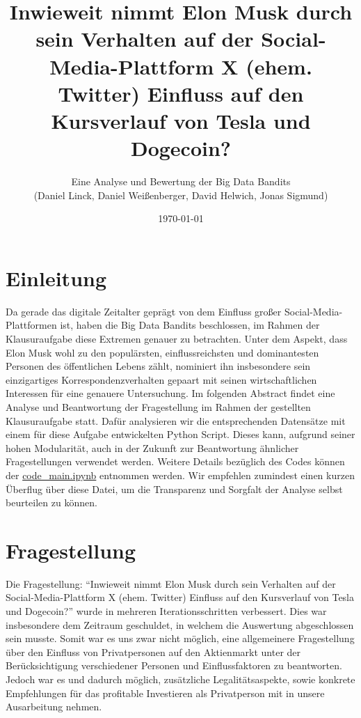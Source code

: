 \documentclass{article}
\title{\textbf {Inwieweit nimmt Elon Musk durch sein Verhalten auf der Social-Media-Plattform X (ehem. Twitter) Einfluss auf den Kursverlauf von Tesla und Dogecoin?}}
\author{Eine Analyse und Bewertung der Big Data Bandits \\ (Daniel Linck, Daniel Weißenberger, David Helwich, Jonas Sigmund)}
\date{\today}
\begin{document}
\maketitle

\tableofcontents
\newpage

\section{Einleitung} \label{Einleitung}
Da gerade das digitale Zeitalter geprägt von dem Einfluss großer Social-Media-Plattformen ist, haben die Big Data Bandits beschlossen, im Rahmen der Klausuraufgabe diese Extremen genauer zu betrachten.
Unter dem Aspekt, dass Elon Musk wohl zu den populärsten, einflussreichsten und dominantesten Personen des öffentlichen Lebens zählt, nominiert ihn insbesondere sein einzigartiges Korrespondenzverhalten gepaart mit seinen wirtschaftlichen Interessen für eine genauere Untersuchung.
Im folgenden Abstract findet eine Analyse und Beantwortung der Fragestellung im Rahmen der gestellten Klausuraufgabe statt.
Dafür analysieren wir die entsprechenden Datensätze mit einem für diese Aufgabe entwickelten Python Script.
Dieses kann, aufgrund seiner hohen Modularität, auch in der Zukunft zur Beantwortung ähnlicher Fragestellungen verwendet werden.
Weitere Details bezüglich des Codes können der \href{https://github.com/alphaname007/BigDataBandits/blob/19beac1a6b5469aed05b4a6c072883810df6aacd/code\_main.ipynb}{code\_main.ipynb} entnommen werden.
Wir empfehlen zumindest einen kurzen Überflug über diese Datei, um die Transparenz und Sorgfalt der Analyse selbst beurteilen zu können.


\section{Fragestellung} \label{Fragestellung}
Die Fragestellung: ``Inwieweit nimmt Elon Musk durch sein Verhalten auf der Social-Media-Plattform X (ehem. Twitter) Einfluss auf den Kursverlauf von Tesla und Dogecoin?'' wurde in mehreren Iterationsschritten verbessert. 
Dies war insbesondere dem Zeitraum geschuldet, in welchem die Auswertung abgeschlossen sein musste.
Somit war es uns zwar nicht möglich, eine allgemeinere Fragestellung über den Einfluss von Privatpersonen auf den Aktienmarkt unter der Berücksichtigung verschiedener Personen und Einflussfaktoren zu beantworten.
Jedoch war es und dadurch möglich, zusätzliche Legalitätsaspekte, sowie konkrete Empfehlungen für das profitable Investieren als Privatperson mit in unsere Ausarbeitung nehmen.
\end{document}
